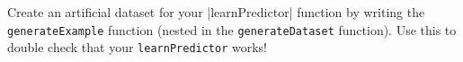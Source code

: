 \item {}

Create an artificial dataset for your |learnPredictor| function by
writing the {\tt generateExample} function (nested in the {\tt generateDataset}
function). Use this to double check that your {\tt learnPredictor} works!
